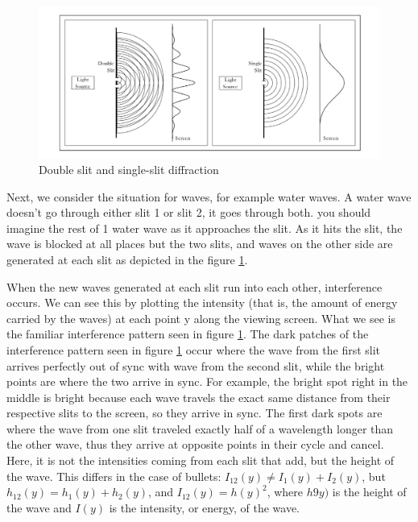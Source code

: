 \documentclass[12pt, oneside]{book}
\theoremstyle{definition}
\theoremstyle{definition}
\theoremstyle{remark}
\begin{document}
\begin{figure}
    \centering
    \includegraphics[width=1\linewidth]{../images/Doubleslit.png}
    \caption{Double slit and single-slit diffraction}
    \label{fig:slitexperiment}
\end{figure}

Next, we consider the situation for waves, for example water waves. A water wave doesn't go through either slit 1 or slit 2, it goes through both. you should imagine the rest of 1 water wave as it approaches the slit. As it hits the slit, the wave is blocked at all places but the two slits, and waves on the other side are generated at each slit as depicted in the figure \ref{fig:slitexperiment}.

When the new waves generated at each slit run into each other, interference occurs. We can see this by plotting the intensity (that is, the amount of energy carried by the waves) at each point y along the viewing screen. What we see is the familiar interference pattern seen in figure \ref{fig:slitexperiment}. The dark patches of the interference pattern seen in figure \ref{fig:slitexperiment} occur where the wave from the first slit arrives perfectly out of sync with wave from the second slit, while the bright points are where the two arrive in sync. For example, the bright spot right in the middle is bright because each wave travels the exact same distance from their respective slits to the screen, so they arrive in sync. The first dark spots are where the wave from one slit traveled exactly half of a wavelength longer than the other wave, thus they arrive at opposite points in their cycle and cancel. Here, it is not the intensities coming from each slit that add, but the height of the wave. This differs in the case of bullets: $I_{12}(y)\neq I_1(y)+I_2(y)$, but $h_{12}(y)=h_1(y)+h_2(y)$, and $I_{12}(y)=h(y)^2$, where $h9y)$ is the height of the wave and $I(y)$ is the intensity, or energy, of the wave.
\end{document}
